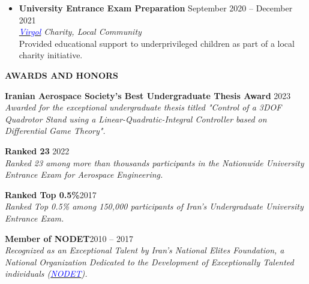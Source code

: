 \documentclass[12pt]{article}
\begin{document}
\begin{itemize}
	\item {\bfseries University Entrance Exam Preparation}
	\hfill September 2020 -- December 2021 \\
	\textit{\href{https://www.instagram.com/virgool_charity?igsh=MWxsOGF3cTk1dzY3dw==}{\textcolor{blue}{Virgol}} Charity, Local Community} \\
	Provided educational support to underprivileged children as part of a local charity initiative.
\end{itemize}


\vspace{0.2in} %


\begin{center}
	{\noindent \bfseries AWARDS AND HONORS}
\end{center}


\vspace{8pt} %


\noindent
{\bfseries Iranian Aerospace Society's Best Undergraduate Thesis Award}
\hfill 2023 \vspace{4pt} \\
\textit{Awarded for the exceptional
undergraduate thesis titled "Control of a 3DOF Quadrotor Stand using a Linear-Quadratic-Integral Controller
based on Differential Game Theory".}

\vspace{04pt}
\noindent
{\bfseries Ranked 23}
\hfill 2022 \vspace{4pt}\\
\textit{Ranked 23 among more than thousands participants in the Nationwide University Entrance Exam for Aerospace Engineering.}




\vspace{04pt}
\noindent
{\bfseries Ranked Top 0.5\%}\hfill 2017 \vspace{4pt} \\
\textit{Ranked Top 0.5\% among 150,000 participants of Iran's Undergraduate University Entrance Exam.}

\vspace{04pt}
\noindent
{\bfseries Member of NODET}\hfill 2010 -- 2017 \vspace{4pt} \\
\textit{
	Recognized as an Exceptional Talent by Iran's National Elites Foundation, a National Organization Dedicated to the Development of Exceptionally Talented individuals (\textit{\href{https://en.wikipedia.org/wiki/National_Organization_for_Development_of_Exceptional_Talents}{\textcolor{blue}{NODET}}}).
}
\end{document}
